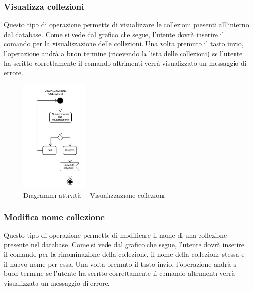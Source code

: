 \documentclass{scalatekids-article}
\begin{document}
\subsubsection{Visualizza collezioni}

Questo tipo di operazione permette di visualizzare le collezioni presenti
all'interno dal database. Come si vede dal grafico che segue, l'utente dovrà
inserire il comando per la visualizzazione delle collezioni. Una volta premuto
il tasto invio, l'operazione andrà a buon termine (ricevendo la lista delle
collezioni) se l'utente ha scritto correttamente il comando altrimenti verrà
visualizzato un messaggio di errore.

\begin{figure}[H]
  \begin{center}
    \includegraphics[width=0.3\textwidth, keepaspectratio]{img/diagrammiAttivita/visCollezione.jpeg}
    \caption{Diagrammi attività\ -\ Visualizzazione collezioni}
  \end{center}
\end{figure}

\subsubsection{Modifica nome collezione}

Questo tipo di operazione permette di modificare il nome di una collezione
presente nel database. Come si vede dal grafico che segue, l'utente dovrà
inserire il comando per la rinominazione della collezione, il nome della
collezione stessa e il nuovo nome per essa. Una volta premuto il tasto invio,
l'operazione andrà a buon termine se l'utente ha scritto correttamente il
comando altrimenti verrà visualizzato un messaggio di errore.
\end{document}
